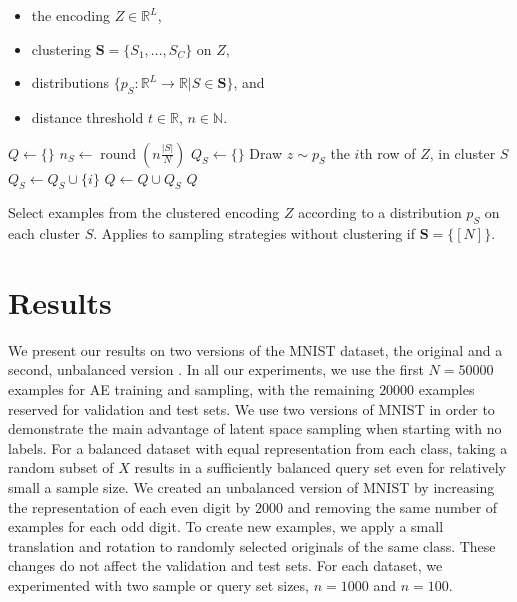 \documentclass[a4paper]{article}
\DeclareMathOperator{\round}{round}
\begin{document}
\begin{algorithm}
  \begin{algorithmic}[1]
    \Require \hfill %
    \begin{itemize}
    \item the encoding $Z \in \mathbb{R}^L$,
    \item clustering $\mathbf{S} = \{S_1 , \dots, S_C\}$ on $Z$,
    \item distributions
      $\{p_S : \mathbb{R}^L \rightarrow \mathbb{R}| S \in \mathbf{S}\}$, and
    \item distance threshold
      $t \in \mathbb{R}$, $n \in \mathbb{N}$.
    \end{itemize}

    \State $Q \gets \{\}$ %
    \State $n_S \gets \round\left(n \frac{|S|}{N}\right) $ %
    \State $Q_S \gets \{\} $ %
    \State Draw $z \sim p_S$ %
     \Comment the $i$th row of $Z$, in cluster $S$ %
    \State $Q_S \gets Q_S \cup \{i\}$ %
    \EndIf %
    \EndFor %
    \EndWhile %
    \State $Q \gets Q \cup Q_S$ %
    \EndFor %
    \State \Return $Q$ %
  \end{algorithmic}
  \caption{Select examples from the clustered encoding $Z$ according to a
    distribution $p_S$ on each cluster $S$. Applies to sampling strategies
    without clustering if $\mathbf{S} = \{[N]\}$.}
  \label{alg:sampling}
\end{algorithm}

\section{Results}
\label{sec:results}

We present our results on two versions of the MNIST dataset, the original and a
second, unbalanced version \cite{lecun_mnist_2010}. In all our experiments, we
use the first $N = 50000$ examples for AE training and sampling, with the
remaining $20000$ examples reserved for validation and test sets. We use two
versions of MNIST in order to demonstrate the main advantage of latent space
sampling when starting with no labels. For a balanced dataset with equal
representation from each class, taking a random subset of $X$ results in a
sufficiently balanced query set even for relatively small a sample size. We
created an unbalanced version of MNIST by increasing the representation of each
even digit by $2000$ and removing the same number of examples for each odd
digit. To create new examples, we apply a small translation and rotation to
randomly selected originals of the same class. These changes do not affect the
validation and test sets. For each dataset, we experimented with two sample or
query set sizes, $n=1000$ and $n=100$.
\end{document}
